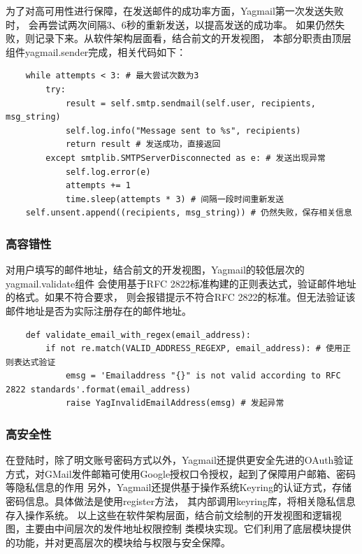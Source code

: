 \documentclass[UTF8,12pt,a4paper]{ctexart}
\begin{document}
    为了对高可用性进行保障，在发送邮件的成功率方面，Yagmail第一次发送失败时，
    会再尝试两次间隔3、6秒的重新发送，以提高发送的成功率。
    如果仍然失败，则记录下来。从软件架构层面看，结合前文的开发视图，
    本部分职责由顶层组件yagmail.sender完成，相关代码如下：
    
    \begin{lstlisting} 
    while attempts < 3: # 最大尝试次数为3
        try:
            result = self.smtp.sendmail(self.user, recipients, msg_string)
            self.log.info("Message sent to %s", recipients)
            return result # 发送成功，直接返回
        except smtplib.SMTPServerDisconnected as e: # 发送出现异常
            self.log.error(e)
            attempts += 1
            time.sleep(attempts * 3) # 间隔一段时间重新发送
    self.unsent.append((recipients, msg_string)) # 仍然失败，保存相关信息
    \end{lstlisting}
    
    \subsubsection{高容错性}
    
    对用户填写的邮件地址，结合前文的开发视图，Yagmail的较低层次的yagmail.validate组件
    会使用基于RFC 2822标准构建的正则表达式，验证邮件地址的格式。如果不符合要求，
    则会报错提示不符合RFC 2822的标准。但无法验证该邮件地址是否为实际注册存在的邮件地址。
    
    \begin{lstlisting} 
    def validate_email_with_regex(email_address):
        if not re.match(VALID_ADDRESS_REGEXP, email_address): # 使用正则表达式验证
            emsg = 'Emailaddress "{}" is not valid according to RFC 2822 standards'.format(email_address)
            raise YagInvalidEmailAddress(emsg) # 发起异常
    \end{lstlisting}

    \subsubsection{高安全性}

    在登陆时，除了明文账号密码方式以外，Yagmail还提供更安全先进的OAuth验证方式，对GMail发件邮箱可使用Google授权口令授权，起到了保障用户邮箱、密码等隐私信息的作用
    另外，Yagmail还提供基于操作系统Keyring的认证方式，存储密码信息。具体做法是使用register方法，
    其内部调用keyring库，将相关隐私信息存入操作系统。
    以上这些在软件架构层面，结合前文绘制的开发视图和逻辑视图，主要由中间层次的发件地址权限控制
    类模块实现。它们利用了底层模块提供的功能，并对更高层次的模块给与权限与安全保障。
    
\end{document}
